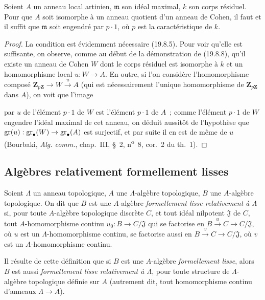 \begin{proposition}[19.8.11]
\label{0.19.8.11-fr}
Soient $A$ un anneau local artinien, $\mathfrak m$ son idéal maximal, $k$ son
corps résiduel. Pour que $A$ soit isomorphe à un anneau quotient d'un anneau de
Cohen, il faut et il suffit que $\mathfrak m$ soit engendré par $p\cdot1$, où
$p$ est la caractéristique de $k$.
\end{proposition}

\begin{proof}
La condition est évidemment nécessaire (19.8.5). Pour voir qu'elle est
suffisante, on observe, comme au début de la démonstration de (19.8.8), qu'il
existe un anneau de Cohen $W$ dont le corps résiduel est isomorphe à $k$ et un
homomorphisme local $u:W\to A$. En outre, si l'on considère l'homomorphisme
composé $\mathbf Z_{p\mathbf Z}\to W\xrightarrow{u}A$ (qui est nécessairement
l'unique homomorphisme de $\mathbf Z_{p\mathbf Z}$ dans $A$), on voit que
l'image


par $u$ de l'élément $p\cdot1$ de $W$ est l'élément $p\cdot1$ de $A$~; comme
l'élément $p\cdot1$ de $W$ engendre l'idéal maximal de cet anneau, on déduit
aussitôt de l'hypothèse que
$\operatorname{gr}(u):\operatorname{gr}_\bullet(W)\to\operatorname{gr}_\bullet(A)$ est surjectif, et par suite il en est
de même de $u$ (Bourbaki, \emph{Alg. comm.}, chap.~III, §~2,
n\textsuperscript{o}~8, cor.~2 du th.~1).
\end{proof}

\subsection{Algèbres relativement formellement lisses}
\label{subsection:0.19.9-fr}

\begin{definition}[19.9.1]
\label{0.19.9.1-fr}
Soient $\Lambda$ un anneau topologique, $A$ une $\Lambda$-algèbre topologique,
$B$ une $A$-algèbre topologique. On dit que $B$ est une $A$-algèbre
\emph{formellement lisse relativement à $\Lambda$} si, pour toute $A$-algèbre
topologique discrète $C$, et tout idéal nilpotent $\mathfrak J$ de $C$, tout
$A$-homomorphisme continu $u_0:B\to C/\mathfrak J$ qui se factorise en
$B\xrightarrow{u}C\to C/\mathfrak J$, où $u$ est un $\Lambda$-homomorphisme
continu, se factorise aussi en $B\xrightarrow{v}C\to C/\mathfrak J$, où $v$
est un $A$-homomorphisme continu.
\end{definition}

Il résulte de cette définition que si $B$ est une $A$-algèbre \emph{formellement
lisse}, alors $B$ est aussi \emph{formellement lisse relativement à
$\Lambda$}, pour toute structure de $\Lambda$-algèbre topologique définie sur
$A$ (autrement dit, tout homomorphisme continu d'anneaux $\Lambda\to A$).

